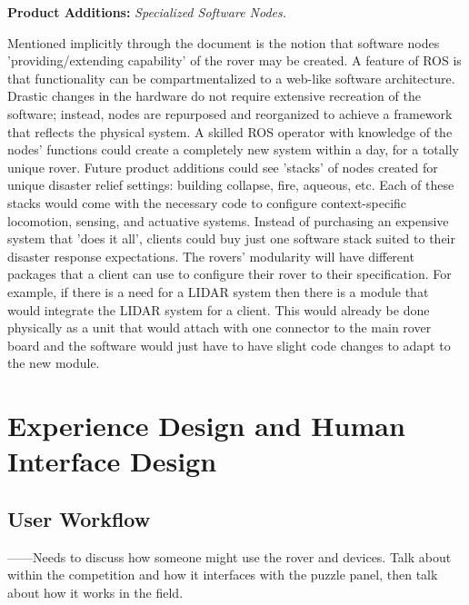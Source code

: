 \documentclass[a4paper, 10pt]{article}
\begin{document}
		\textbf{Product Additions:} \emph{Specialized Software Nodes.}
		
	Mentioned implicitly through the document is the notion that software nodes 'providing/extending capability' of the rover may be created. A feature of ROS is that functionality can be compartmentalized to a web-like software architecture. Drastic changes in the hardware do not require extensive recreation of the software; instead, nodes are repurposed and reorganized to achieve a framework that reflects the physical system. A skilled ROS operator with knowledge of the nodes' functions could create a completely new system within a day, for a totally unique rover. Future product additions could see 'stacks' of nodes created for unique disaster relief settings: building collapse, fire, aqueous, etc. Each of these stacks would come with the necessary code to configure context-specific locomotion, sensing, and actuative systems. Instead of purchasing an expensive system that 'does it all', clients could buy just one software stack suited to their disaster response expectations. 
	The rovers' modularity will have different packages that a client can use to configure their rover to their specification. For example, if there is a need for a LIDAR system then there is a module that would integrate the LIDAR system for a client. This would already be done physically as a unit that would attach with one connector to the main rover board and the software would just have to have slight code changes to adapt to the new module. 

\pagebreak
	




\section{Experience Design and Human Interface Design}
	\subsection{User Workflow}
	------Needs to discuss how someone might use the rover and devices. Talk about within the competition and how it interfaces with the puzzle panel, then talk about how it works in the field. 
	
\end{document}
